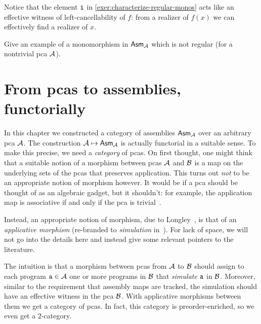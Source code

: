 Notice that the element \(\pca{i}\) in \cref{exer:characterize-regular-monos}
acts like an effective witness of left-cancellability of \(f\): from a realizer
of \(f(x)\) we can effectively find a realizer of \(x\).

\begin{exercise}\label{exer:mono-but-not-regular-mono}
  Give an example of a monomorphism in \(\Asm{\AA}\) which is not regular (for a
  nontrivial pca \(\AA\)).
\end{exercise}


\section{From pcas to assemblies, functorially}
In this chapter we constructed a category of assemblies \(\Asm{\AA}\) over an
arbitrary pca \(\AA\). The construction \(\AA \mapsto \Asm{\AA}\) is actually
functorial in a suitable sense.
%
To make this precise, we need a \emph{category} of pcas.
%
On first thought, one might think that a suitable notion of a morphism between
pcas \(\AA\) and \(\BB\) is a map on the underlying sets of the pcas that
preserves application.
%
This turns out \emph{not} to be an appropriate notion of morphism however. It
would be if a pca should be thought of as an algebraic gadget, but it shouldn't:
for example, the application map is associative if and only if the pca is
trivial~\cite[Proposition~1.3.1]{vanOosten2008}.
%

Instead, an appropriate notion of morphism, due to Longley~\cite{Longley1995},
is that of an \emph{applicative morphism} (re-branded to \emph{simulation}
in~\cite{Bauer2023}).
%
For lack of space, we will not go into the details here and instead give some
relevant pointers to the literature.

The intuition is that a morphism between pcas from \(\AA\) to \(\BB\) should
assign to each program \(\pca{a} \in \AA\) one or more programs in \(\BB\) that
\emph{simulate} \(\pca{a}\) in \(\BB\).
%
Moreover, similar to the requirement that assembly maps are tracked, the
simulation should have an effective witness in the pca \(\BB\).
%
With applicative morphisms between them we get a category of pcas. In fact, this
category is preorder-enriched, so we even get a 2-category.

